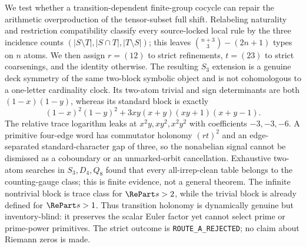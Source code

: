 We test whether a transition-dependent finite-group cocycle can repair the
arithmetic overproduction of the tensor-subset full shift.  Relabeling
naturality and restriction compatibility classify every source-locked local rule
by the three incidence counts
$(|S\setminus T|,|S\cap T|,|T\setminus S|)$; this leaves
$\binom{n+3}{3}-(2n+1)$ types on $n$ atoms.  We then assign
$r=(12)$ to strict refinements, $t=(23)$ to strict coarsenings, and the
identity otherwise.  The resulting $S_3$ extension is a genuine deck
symmetry of the same two-block symbolic object and is not cohomologous to a
one-letter cardinality clock.  Its two-atom trivial and sign determinants
are both $(1-x)(1-y)$, whereas its standard block is exactly
\[
(1-x)^2(1-y)^2+3xy(x+y)(xy+1)(x+y-1).
\]
The relative trace logarithm leaks at $x^2y,xy^2,x^2y^2$ with coefficients
$-3,-3,-6$.  A primitive four-edge word has commutator holonomy $(rt)^2$
and an edge-separated standard-character gap of three, so the nonabelian
signal cannot be dismissed as a coboundary or an unmarked-orbit
cancellation.  Exhaustive two-atom searches in $S_3,D_4,Q_8$ found that
every all-irrep-clean table belongs to the counting-gauge class; this is
finite evidence, not a general theorem.  The infinite nontrivial block is
trace class for $\RePart s>2$, while the trivial block is already defined
for $\RePart s>1$.  Thus transition holonomy is dynamically genuine but
inventory-blind: it preserves the scalar Euler factor yet cannot select
prime or prime-power primitives.  The strict outcome is
\texttt{ROUTE\_A\_REJECTED}; no claim about Riemann zeros is made.
